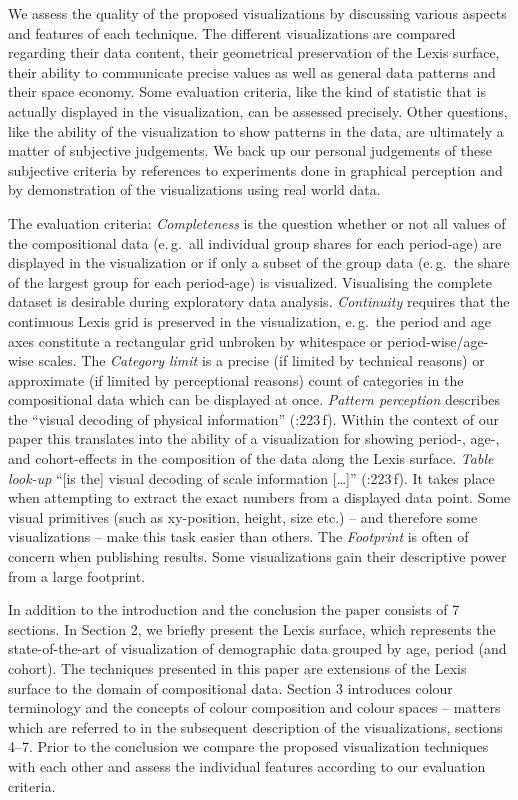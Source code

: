 \documentclass[a4paper]{scrartcl}
\begin{document}
We assess the quality of the proposed visualizations by discussing various aspects and features of each technique. The different visualizations are compared regarding their data content, their geometrical preservation of the Lexis surface, their ability to communicate precise values as well as general data patterns and their space economy. Some evaluation criteria, like the kind of statistic that is actually displayed in the visualization, can be assessed precisely. Other questions, like the ability of the visualization to show patterns in the data, are ultimately a matter of subjective judgements. We back up our personal judgements of these subjective criteria by references to experiments done in graphical perception and by demonstration of the visualizations using real world data.

The evaluation criteria:
\emph{Completeness} is the question whether or not all values of the compositional data (e.\,g.~all individual group shares for each period-age) are displayed in the visualization or if only a subset of the group data (e.\,g.~the share of the largest group for each period-age) is visualized. Visualising the complete dataset is desirable during exploratory data analysis.
\emph{Continuity} requires that the continuous Lexis grid is preserved in the visualization, e.\,g.~the period and age axes constitute a rectangular grid unbroken by whitespace or period-wise/age-wise scales.
The \emph{Category limit} is a precise (if limited by technical reasons) or approximate (if limited by perceptional reasons) count of categories in the compositional data which can be displayed at once.
\emph{Pattern perception} describes the \enquote{visual decoding of physical information} (\cite{Cleveland1994}:223\,f). Within the context of our paper this translates into the ability of a visualization for showing period-, age-, and cohort-effects in the composition of the data along the Lexis surface.
\emph{Table look-up} \enquote{[is the] visual decoding of scale information [\ldots]} (\cite{Cleveland1994}:223\,f). It takes place when attempting to extract the exact numbers from a displayed data point. Some visual primitives (such as xy-position, height, size etc.) -- and therefore some visualizations -- make this task easier than others.
The \emph{Footprint} is often of concern when publishing results. Some visualizations gain their descriptive power from a large footprint.

In addition to the introduction and the conclusion the paper consists of 7 sections. In Section 2, we briefly present the Lexis surface, which represents the state-of-the-art of visualization of demographic data grouped by age, period (and cohort). The techniques presented in this paper are extensions of the Lexis surface to the domain of compositional data. Section 3 introduces colour terminology and the concepts of colour composition and colour spaces -- matters which are referred to in the subsequent description of the visualizations, sections 4--7. Prior to the conclusion we compare the proposed visualization techniques with each other and assess the individual features according to our evaluation criteria.
\end{document}
